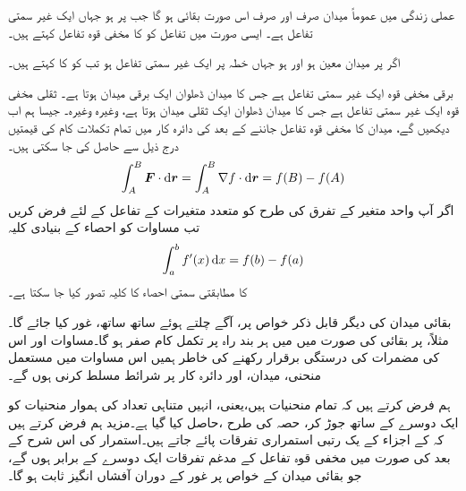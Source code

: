 عملی زندگی میں عموماً میدان  صرف اور صرف اس صورت بقائی ہو گا جب   پر  ہو جہاں  ایک غیر سمتی تفاعل ہے۔ ایسی صورت میں تفاعل  کو  کا مخفی قوہ تفاعل کہتے ہیں۔   

اگر پر میدان  معین ہو اور  ہو جہاں  خطہ  پر ایک غیر سمتی تفاعل ہو تب  کو  کا  کہتے ہیں۔

برقی مخفی قوہ ایک غیر سمتی تفاعل ہے جس کا میدان ڈھلوان  ایک برقی میدان ہوتا ہے۔  ثقلی مخفی قوہ ایک غیر سمتی تفاعل ہے جس کا میدان ڈھلوان ایک  ثقلی میدان ہوتا ہے، وغیرہ وغیرہ۔ جیسا ہم اب دیکھیں گے،  میدان  کا مخفی قوہ تفاعل  جاننے کے بعد  کی دائرہ کار میں تمام تکملات کام  کی قیمتیں درج ذیل سے حاصل کی جا سکتی ہیں۔
\begin{align}\label{مساوات_سمتی_تکمل_مخفی_قوہ_استعمال}
\int_A^B\kvec{F}\cdot\dif\kvec{r}=\int_A^B\nabla f\cdot\dif \kvec{r}=f(B)-f(A)
\end{align}
اگر آپ واحد متغیر کے تفرق  کی طرح   کو متعدد متغیرات کے تفاعل کے لئے فرض کریں تب مساوات  کو احصاء کے بنیادی کلیہ
\begin{align*}
\int_a^bf'(x)\dif x=f(b)-f(a)
\end{align*}  
کا مطابقتی سمتی احصاء کا کلیہ تصور کیا جا سکتا ہے۔

بقائی میدان کی دیگر قابل ذکر خواص پر، آگے چلتے ہوئے ساتھ ساتھ، غور کیا جائے گا۔ مثلاً،  پر بقائی  کی صورت میں  میں ہر بند راہ پر تکمل کام صفر ہو گا۔مساوات  اور اس کی مضمرات کی درستگی برقرار رکھنے  کی خاطر ہمیں اس مساوات میں مستعمل منحنی، میدان، اور دائرہ کار پر شرائط مسلط کرنی ہوں گے۔

ہم فرض کرتے ہیں کہ تمام منحنیات  ہیں،یعنی، انہیں متناہی تعداد کی ہموار  منحنیات کو ایک دوسرے کے ساتھ جوڑ کر، حصہ  کی طرح ،حاصل کیا گیا ہے۔مزید ہم فرض کرتے ہیں کہ  کے اجزاء کے یک رتبی استمراری تفرقات  پائے جاتے ہیں۔استمرار کی اس شرح  کے بعد  کی صورت میں مخفی قوہ تفاعل  کے مدغم تفرقات ایک دوسرے کے برابر ہوں گے، جو بقائی میدان  کے خواص پر غور کے دوران آفشاں انگیز ثابت ہو گا۔

